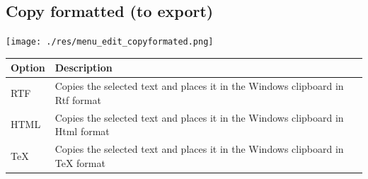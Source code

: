 \hypertarget{menu_edit_copyformatted}{}
\subsection{Copy formatted (to export)}

\texttt{[image: ./res/menu\_edit\_copyformated.png]}\\

\begin{scriptsize}\begin{tabularx}{\textwidth}{>{\hsize=0.1\hsize}X>{\hsize=0.7\hsize}X}\\
    \hline
    \textbf{Option} & \textbf{Description} \\
    \hline
    RTF & Copies the selected text and places it in the Windows clipboard in Rtf format \\
    HTML & Copies the selected text and places it in the Windows clipboard in Html format \\
    TeX & Copies the selected text and places it in the Windows clipboard in TeX format \\
    \hline
  \end{tabularx}\end{scriptsize}
